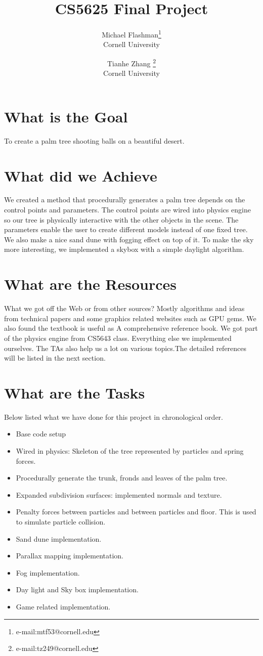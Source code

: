 \documentclass[annual]{acmsiggraph}
\title{CS5625 Final Project}
\author{Michael Flashman\thanks{e-mail:mtf53@cornell.edu}\\Cornell University \and Tianhe Zhang \thanks{e-mail:tz249@cornell.edu}\\Cornell University}
\begin{document}
\maketitle


\section{What is the Goal}
To create a palm tree shooting balls on a beautiful desert.

\section{What did we Achieve}
We created a method that procedurally generates a palm tree depends on the control points and parameters. The control points are wired into physics engine so our tree is physically interactive with the other objects in the scene. The parameters enable the user to create different models instead of one fixed tree. We also make a nice sand dune with fogging effect on top of it. To make the sky more interesting, we implemented a skybox with a simple daylight algorithm.

\section{What are the Resources}
What we got off the Web or from other sources? Mostly algorithms and ideas from technical papers and some graphics related websites such as GPU gems. We also found the textbook is useful as A comprehensive reference book. We got part of the physics engine from CS5643 class. Everything else we implemented ourselves. The TAs also help us a lot on various topics.The detailed references will be listed in the next section.

\section{What are the Tasks}
Below listed what we have done for this project in chronological order.
\begin{itemize}
\item{Base code setup}
\item{Wired in physics: Skeleton of the tree represented by particles and spring forces. }
\item{Procedurally generate the trunk, fronds and leaves of the palm tree.}
\item{Expanded subdivision surfaces: implemented normals and texture.}
\item{Penalty forces between particles and between particles and floor. This is used to simulate particle collision.}
\item{Sand dune implementation.}
\item{Parallax mapping implementation.}
\item{Fog implementation.}
\item{Day light and Sky box implementation.}
\item{Game related implementation.}
\end{itemize}
\end{document}
